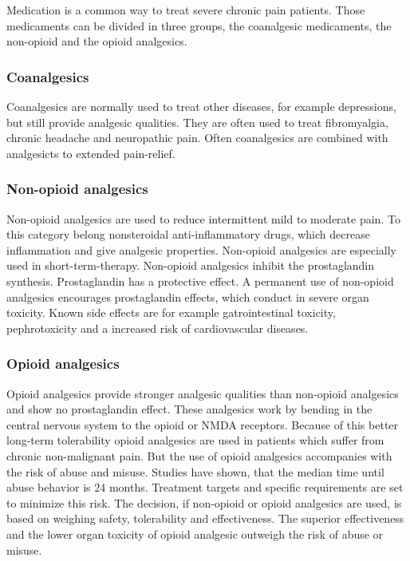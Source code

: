Medication is a common way to treat severe chronic pain patients.%
Those medicaments can be divided in three groups, the coanalgesic medicaments, the non-opioid and the opioid analgesics. \cite{marcus2009}

\subsubsection{Coanalgesics}

Coanalgesics are normally used to treat other diseases, for example depressions, but still provide analgesic qualities. They are often used to treat fibromyalgia, chronic headache and neuropathic pain. Often coanalgesics are combined with analgesicts to extended pain-relief. \cite{marcus2009}

\subsubsection{Non-opioid analgesics}

Non-opioid analgesics are used to reduce intermittent mild to moderate pain. To this category belong nonsteroidal anti-inflammatory drugs, which decrease inflammation and give analgesic properties. Non-opioid analgesics are especially used in short-term-therapy. Non-opioid analgesics inhibit the prostaglandin synthesis. Prostaglandin has a protective effect. A permanent use of non-opioid analgesics encourages prostaglandin effects, which conduct in severe organ toxicity. Known side effects are for example gatrointestinal toxicity, pephrotoxicity and a increased risk of cardiovascular diseases. \cite{marcus2009,stein2007}

\subsubsection{Opioid analgesics}

Opioid analgesics provide stronger analgesic qualities than non-opioid analgesics and show no prostaglandin effect. These analgesics work by bending in the central nervous system to the opioid or NMDA receptors.  Because of this better long-term tolerability opioid analgesics are used in patients which suffer from chronic non-malignant pain. But the use of opioid analgesics accompanies with the risk of abuse and misuse. Studies have shown, that the median time until abuse behavior is 24 months. Treatment targets and specific requirements are set to minimize this risk. \cite{marcus2009,stein2007}
The decision, if non-opioid or opioid analgesics are used, is based on weighing safety, tolerability and effectiveness. The superior effectiveness and the lower organ toxicity of opioid analgesic outweigh the risk of abuse or misuse. \cite{marcus2009}
